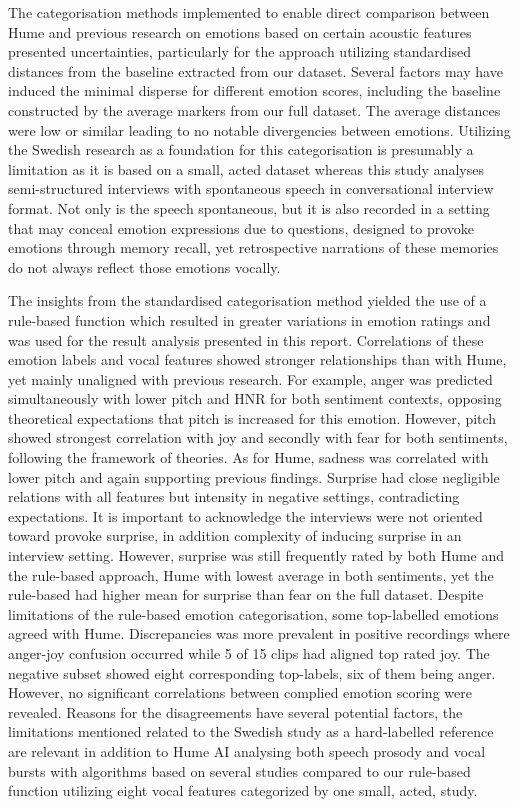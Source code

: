 \medskip
The categorisation methods implemented to enable direct comparison between Hume and previous research on emotions based on certain acoustic features presented uncertainties, particularly for the approach utilizing standardised distances from the baseline extracted from our dataset. 
Several factors may have induced the minimal disperse for different emotion scores, including the baseline constructed by the average markers from our full dataset. The average distances were low or similar leading to no notable divergencies between emotions. 
Utilizing the Swedish research as a foundation for this categorisation is presumably a limitation as it is based on a small, acted dataset whereas this study analyses semi-structured interviews with spontaneous speech in conversational interview format. 
Not only is the speech spontaneous, but it is also recorded in a setting that may conceal emotion expressions due to questions, designed to provoke emotions through memory recall, yet retrospective narrations of these memories do not always reflect those emotions vocally. 

The insights from the standardised categorisation method yielded the use of a rule-based function which resulted in greater variations in emotion ratings and was used for the result analysis presented in this report. Correlations of these emotion labels and vocal features showed stronger relationships than with Hume, 
yet mainly unaligned with previous research. For example, anger was predicted simultaneously with lower pitch and HNR for both sentiment contexts, opposing theoretical expectations that pitch is increased for this emotion. However, pitch showed strongest correlation with joy and secondly with fear for both sentiments, 
following the framework of theories. As for Hume, sadness was correlated with lower pitch and again supporting previous findings. 
Surprise had close negligible relations with all features but intensity in negative settings, contradicting expectations. It is important to acknowledge the interviews were not oriented toward provoke surprise, in addition complexity of inducing surprise in an interview setting. 
However, surprise was still frequently rated by both Hume and the rule-based approach, Hume with lowest average in both sentiments, yet the rule-based had higher mean for surprise than fear on the full dataset. 
Despite limitations of the rule-based emotion categorisation, some top-labelled emotions agreed with Hume. Discrepancies was more prevalent in positive recordings where anger-joy confusion occurred while 5 of 15 clips had aligned top rated joy. The negative subset showed eight corresponding top-labels, 
six of them being anger. However, no significant correlations between complied emotion scoring were revealed. Reasons for the disagreements have several potential factors, the limitations mentioned related to the Swedish study as a hard-labelled reference are relevant in addition to Hume AI analysing both 
speech prosody and vocal bursts with algorithms based on several studies compared to our rule-based function utilizing eight vocal features categorized by one small, acted, study. 

